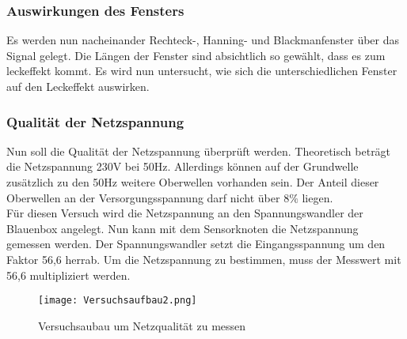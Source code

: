 \documentclass{article}%
\begin{document}
\subsubsection{Auswirkungen des Fensters}
Es werden nun nacheinander Rechteck-, Hanning- und Blackmanfenster über das Signal gelegt. Die Längen der Fenster sind absichtlich so gewählt, dass es zum leckeffekt kommt. Es wird nun untersucht, wie sich die unterschiedlichen Fenster auf den Leckeffekt auswirken. 
\subsubsection{Qualität der Netzspannung}
Nun soll die Qualität der Netzspannung überprüft werden. Theoretisch beträgt die Netzspannung 230V bei 50Hz. Allerdings können auf der Grundwelle zusätzlich zu den 50Hz weitere Oberwellen vorhanden sein. Der Anteil dieser Oberwellen an der Versorgungsspannung darf nicht über $8\%$ liegen.\\Für diesen Versuch wird die Netzspannung an den Spannungswandler der Blauenbox angelegt. Nun kann mit dem Sensorknoten die Netzspannung gemessen werden. Der Spannungswandler setzt die Eingangsspannung um den Faktor 56,6 herrab. Um die Netzspannung zu bestimmen, muss der Messwert mit 56,6 multipliziert werden.
\begin{figure}[htb]
\centering
\texttt{[image: Versuchsaufbau2.png]}
\caption{Versuchsaubau um Netzqualität zu messen}
\end{figure}
\end{document}
